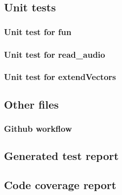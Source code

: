 \documentclass[a4paper,12pt]{article}
\begin{document}
\pagebreak
\subsection*{Unit tests}
\subsubsection*{Unit test for fun}

\subsubsection*{Unit test for read\_audio}

\subsubsection*{Unit test for extendVectors}


\pagebreak
\subsection*{Other files}
\subsubsection*{Github workflow}


\subsection*{Generated test report}


\subsection*{Code coverage report}

\end{document}
